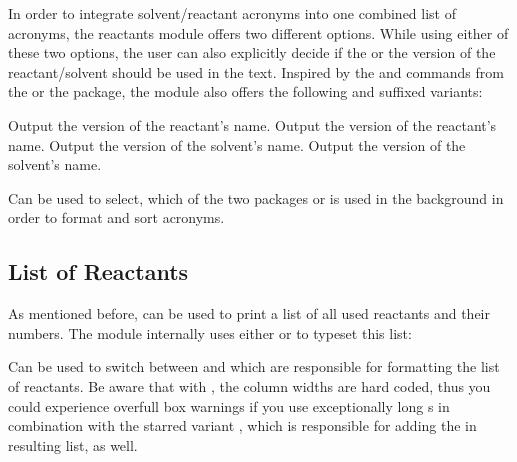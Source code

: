 \documentclass{chemmacros-manual}
\begin{document}
In order to integrate solvent/reactant acronyms into one combined list of acronyms, the 
reactants module offers two different options. While using either of these two options, the 
user can also explicitly decide if the  or the  version of the 
reactant/solvent should be used in the text. Inspired by the  and  commands 
from the  or the  package, the  module 
also offers the following  and  suffixed variants:

\begin{commands}
  Output the  version of the reactant's name.
  Output the  version of the reactant's name.
  Output the  version of the solvent's name.
  Output the  version of the solvent's name.
\end{commands}

\begin{options}
  Can be used to select, which of the two packages  or  
  is used in the background in order to format and sort acronyms.
\end{options}

\begin{example}
  \par
  \par
\end{example}

\subsection{List of Reactants}\label{sec:list-of-reactants}
 As mentioned before,  can be used to print a list of all used reactants 
 and their numbers. The  module internally uses either  or 
  to typeset this list:
\begin{options}
  Can be used to switch between  and  which are responsible for
  formatting the list of reactants. Be aware that with , the column widths are 
  hard coded, thus you could experience overfull box warnings if you use exceptionally long
  s in combination with the starred variant , which is responsible 
  for adding the  in resulting list, as well.
\end{options}
\end{document}
